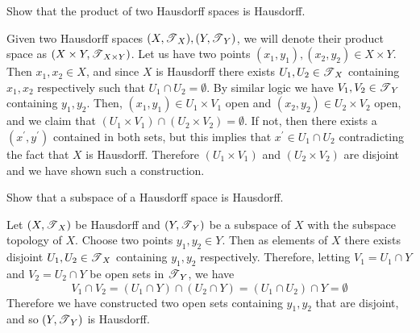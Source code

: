  \begin{exercise}[Munkres 17.11]
    Show that the product of two Hausdorff spaces is Hausdorff.
  \end{exercise}
  \begin{solution}
    Given two Hausdorff spaces $(X, \operatorname{\mathscr{T}}_X), (Y, \operatorname{\mathscr{T}}_Y)$, we will denote their product space as $(X \times Y, \operatorname{\mathscr{T}}_{X \times Y})$. Let us have two points $(x_1, y_1), (x_2, y_2) \in X \times Y$. Then $x_1, x_2 \in X$, and since $X$ is Hausdorff there exists $U_1, U_2 \in \operatorname{\mathscr{T}}_X$ containing $x_1, x_2$ respectively such that $U_1 \cap U_2 = \emptyset$. By similar logic we have $V_1, V_2 \in \operatorname{\mathscr{T}}_Y$ containing $y_1, y_2$. Then, $(x_1, y_1) \in U_1 \times V_1$ open and $(x_2, y_2) \in U_2 \times V_2$ open, and we claim that $(U_1 \times V_1) \cap (U_2 \times V_2) = \emptyset$. If not, then there exists a $(x^\prime, y^\prime)$ contained in both sets, but this implies that $x^\prime \in U_1 \cap U_2$ contradicting the fact that $X$ is Hausdorff. Therefore $(U_1 \times V_1)$ and $(U_2 \times V_2)$ are disjoint and we have shown such a construction. 
  \end{solution}

  \begin{exercise}[Munkres 17.12]
    Show that a subspace of a Hausdorff space is Hausdorff.
  \end{exercise}
  \begin{solution}
    Let $(X, \operatorname{\mathscr{T}}_X)$ be Hausdorff and $(Y, \operatorname{\mathscr{T}}_Y)$ be a subspace of $X$ with the subspace topology of $X$. Choose two points $y_1, y_2 \in Y$. Then as elements of $X$ there exists disjoint $U_1, U_2 \in \operatorname{\mathscr{T}}_X$ containing $y_1, y_2$ respectively. Therefore, letting $V_1 = U_1 \cap Y$ and $V_2 = U_2 \cap Y$ be open sets in $\operatorname{\mathscr{T}}_Y$, we have 
    \begin{equation}
      V_1 \cap V_2 = (U_1 \cap Y) \cap (U_2 \cap Y) = (U_1 \cap U_2) \cap Y = \emptyset 
    \end{equation}
    Therefore we have constructed two open sets containing $y_1, y_2$ that are disjoint, and so $(Y, \operatorname{\mathscr{T}}_Y)$ is Hausdorff. 
  \end{solution}

